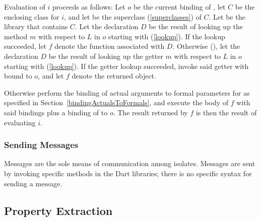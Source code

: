 \documentclass[makeidx]{article}
\begin{document}
{{

\LMHash{}%
%
Evaluation of $i$ proceeds as follows:
Let $o$ be the current binding of \THIS,
let $C$ be the enclosing class for $i$,
and let \SuperClass{} be the superclass (\ref{superclasses}) of $C$.
Let  be the library that contains $C$.
%
Let the declaration $D$ be the result of looking up
the method $m$ with respect to $L$ in $o$ starting with \SuperClass{}
(\ref{lookup}).
If the lookup succeeded,
let $f$ denote the function associated with $D$.
%
Otherwise (),
let the declaration $D$ be the result of looking up
the getter $m$ with respect to $L$ in $o$ starting with \SuperClass{}
(\ref{lookup}).
If the getter lookup succeeded,
invoke said getter with \THIS{} bound to $o$,
and let $f$ denote the returned object.


\LMHash{}%
Otherwise perform the binding of actual arguments to formal parameters for
as specified in Section~\ref{bindingActualsToFormals},
and execute the body of $f$ with said bindings
plus a binding of \THIS{} to $o$.
The result returned by $f$ is then the result of evaluating $i$.

} %


\subsubsection{Sending Messages}

\LMHash{}%
Messages are the sole means of communication among isolates.
Messages are sent by invoking specific methods in the Dart libraries; there is no specific syntax for sending a message.



\subsection{Property Extraction}

}
\end{document}
